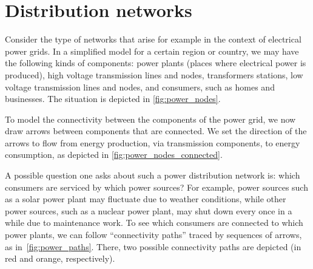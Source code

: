 
\section{Distribution  networks}\label{sec:connection-distribution-networks}
Consider the type of networks that arise for example in the context of electrical power grids.
In a simplified model for a certain region or country, we may have the following kinds of components: power plants (places where electrical power is produced), high voltage transmission lines and nodes, transformers stations, low voltage transmission lines and nodes, and consumers, such as homes and businesses.
The situation is depicted in \cref{fig:power_nodes}.

\begin{figure*}[p]
    \centering
    \caption{Components of electrical power grids.}
    \label{fig:power_nodes}
\end{figure*}

To model the connectivity between the components of the power grid, we now draw arrows between components that are connected.
We set the direction of the arrows to flow from energy production, via transmission components, to energy consumption, as depicted in \cref{fig:power_nodes_connected}.
\begin{figure*}[p]
    \centering
    \caption{Connectivity between components in electric power grids.}
    \label{fig:power_nodes_connected}
\end{figure*}

A possible question one asks about such a power distribution network is: which consumers are serviced by which power sources?
For example, power sources such as a solar power plant may fluctuate due to weather conditions, while other power sources, such as a nuclear power plant, may shut down every once in a while due to maintenance work.
To see which consumers are connected to which power plants, we can follow ``connectivity paths'' traced by sequences of arrows, as in~\cref{fig:power_paths}.
There, two possible connectivity paths are depicted (in red and orange, respectively).

\begin{figure*}[p]
    \centering
    \caption{Connection between consumers and power plants.}
    \label{fig:power_paths}
\end{figure*}

